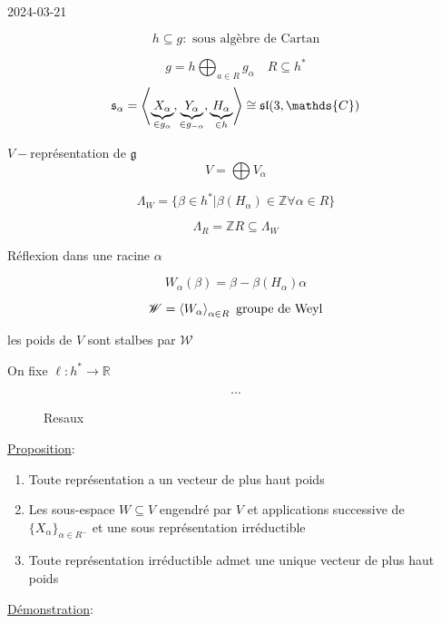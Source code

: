 


2024-03-21

\begin{tcolorbox}[title=Rappels]

	\[ h \subseteq g :\text{ sous algèbre de Cartan} \]

	\[  g = h \bigoplus_{a\in R} g_{\alpha} \quad R \subseteq h^{*}  \]
	\[ \mathfrak{s}_\alpha = \expval{\underbrace{X_{\alpha}}_{\in g_{\alpha} } , \underbrace{Y_{\alpha}}_{\in g_{-\alpha} } , \underbrace{H_{\alpha}}_{\in h}     } \cong \mathfrak{sl}(3, \mathds{C}) \]


	\(V-\)représentation de \(\mathfrak{g}\)
\[ V = \bigoplus V_{\alpha}  \]

\[ \Lambda_W = \{ \beta \in h ^{*} | \beta(H_{\alpha} ) \in \mathds{Z} \forall \alpha \in R  \}  \]


\[ \Lambda_R = \mathds{Z} R \subseteq \Lambda_W\]


Réflexion dans une racine \(\alpha\)

\[ W_{\alpha} (\beta) = \beta - \beta (H_{\alpha}) \alpha \]

\[ \mathscr{W} = \expval{W_{\alpha}}_{\alpha\in R} \text{ groupe de Weyl}   \]

les poids de \(V\) sont stalbes par \(\mathscr{W}\)

On fixe \(\ell : h^{*} \to \mathds{R}\)

\[ \dotsb \]
	 
\end{tcolorbox}

\begin{figure}[ht]
	\centering
	\caption{Resaux}
	\label{fig:resaux}
\end{figure}

\underline{Proposition}: 

\begin{enumerate}[label=(\roman*)]
	\item Toute représentation a un vecteur de plus haut poids
	\item Les sous-espace \(W \subseteq V\) engendré par \(V\) et applications successive de \(\{ X_{\alpha}  \}_{\alpha \in R^{-}} \)  et une sous représentation irréductible
	\item Toute représentation irréductible admet une unique vecteur de plus haut poids
\end{enumerate}

\underline{Démonstration}:

